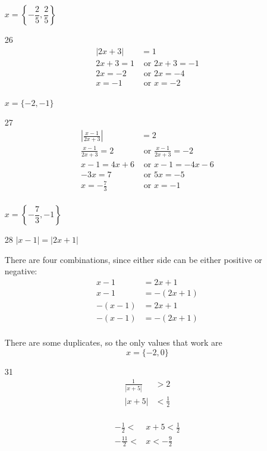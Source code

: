 \documentclass[fleqn,addpoints]{exam}
\begin{document}
\begin{itemize}
$x = \left \{ -\dfrac{2}{5}, \dfrac{2}{5} \right \}$

\item[26]
\begin{align*}
  |2x+3| & = 1 \\
  2x+3 = 1 & \text{ or } 2x + 3 = -1 \\
  2x = -2 & \text{ or } 2x = -4 \\
  x = -1 & \text{ or } x = -2 \\
\end{align*}

$x = \{-2, -1\}$

\item[27]
\begin{align*}
  \left| \frac{x-1}{2x+3} \right| & = 2 \\
  \frac{x-1}{2x+3} = 2 & \text{ or } \frac{x-1}{2x+3} = -2 \\
  x-1 = 4x+6 & \text{ or } x-1 = -4x-6 \\
  -3x = 7 & \text{ or } 5x = -5 \\
  x = -\frac{7}{3} & \text{ or } x = -1 \\
\end{align*}

$x = \left\{ -\dfrac{7}{3}, -1 \right\}$

\item[28]
$|x-1| = |2x+1|$

There are four combinations, since either side can be either positive or negative:
\begin{align*}
  x-1 &= 2x + 1  \\
  x-1 &= -(2x+1) \\
  -(x-1) &= 2x+1 \\ 
  -(x-1) & = -(2x+1) \\
\end{align*}

There are some duplicates, so the only values that work are 
\[
  x=\{-2, 0\}
\]

\item[31]
\begin{align*}
  \frac{1}{|x+5|} &> 2 \\
  |x+5| &< \frac{1}{2} \\
\end{align*}

\begin{align*}
  -\frac{1}{2} < & x+5 < \frac{1}{2} \\
  -\frac{11}{2} < & x  < -\frac{9}{2}
\end{align*}


\end{itemize}
\end{document}
